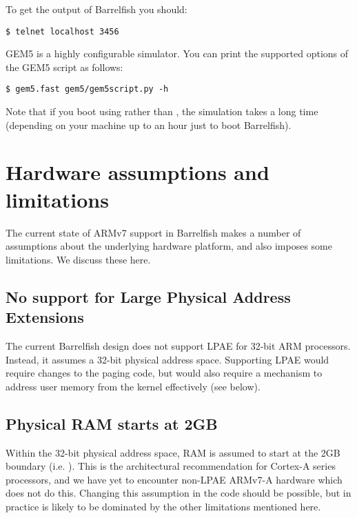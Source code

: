 \documentclass[a4paper,twoside]{report} %
\begin{document}
To get the output of Barrelfish you should:
\begin{lstlisting}
$ telnet localhost 3456
\end{lstlisting}

GEM5 is a highly configurable simulator.  You can print the supported
options of the GEM5 script as follows:

\begin{lstlisting}
$ gem5.fast gem5/gem5script.py -h
\end{lstlisting}

Note that if you boot using  rather than
, the simulation takes a long time (depending on
your machine up to an hour just to boot Barrelfish).
 
\chapter{Hardware assumptions and limitations}

The current state of ARMv7 support in Barrelfish makes a number of
assumptions about the underlying hardware platform, and also imposes
some limitations.  We discuss these here.

\section{No support for Large Physical Address Extensions}

The current Barrelfish design does not support LPAE for 32-bit ARM
processors.  Instead, it assumes a 32-bit physical address space.
Supporting LPAE would require changes to the paging code, but would
also require a mechanism to address user memory from the kernel
effectively (see below). 

\section{Physical RAM starts at 2GB}

Within the 32-bit physical address space, RAM is assumed to start at
the 2GB boundary (i.e. ).  This is the
architectural recommendation for Cortex-A series processors, and we
have yet to encounter non-LPAE ARMv7-A hardware which does not do
this.  Changing this assumption in the code should be possible, but in
practice is likely to be dominated by the other limitations mentioned
here. 
\end{document}
